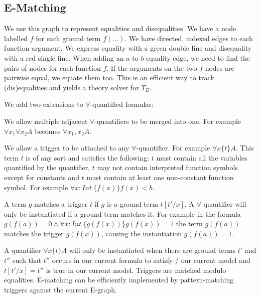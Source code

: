 \subsection{E-Matching}
\begin{mytitle}[E-graph] We use this graph to represent equalities and disequalities. We have a node labelled $f$ for each ground term $f(\ldots)$. We have directed, indexed edges to each function argument. We express equality with a green double line and disequality with a red single line. When adding an $a$ to $b$ equality edge, we need to find the pairs of nodes for each function $f$. If the arguments on the two $f$ nodes are pairwise equal, we equate them too. This is an efficient way to track (dis)equalities and yields a theory solver for $T_E$.
\end{mytitle}

\begin{mytitle} We add two extensions to $\forall$-quantified formulas:
    \begin{mysubtitle} We allow multiple adjacent $\forall$-quantifiers to be merged into one. For example $\forall x_1 \forall x_2 A$ becomes $\forall x_1, x_2 A$.
    \end{mysubtitle}
    \begin{mysubtitle}[Triggers] We allow a trigger to be attached to any $\forall$-quantifier. For example $\forall x \{t\} A$. This term $t$ is of any sort and satisfies the following: $t$ must contain all the variables quantified by the quantifier, $t$ may not contain interpreted function symbols except for constants and $t$ must contain at least one non-constant function symbol. For example $\forall x: Int\ \{f(x)\} f(x) < b$.
    \end{mysubtitle}
\end{mytitle}
\begin{mytitle} A term $g$ matches a trigger $t$ if $g$ is a ground term $t[t'/x]$. A $\forall$-quantifier will only be instantiated if a ground term matches it. For example in the formula $g(f(a))=0 \land \forall x: Int\ \{g(f(x))\} g(f(x)) = 1$ the term $g(f(a))$ matches the trigger $g(f(x))$, causing the instantiation $g(f(a))=1$.
\end{mytitle}
\begin{mytitle}[E-matching] A quantifier $\forall x\{t\} A$ will only be instantiated when there are ground terms $t'$ and $t''$ such that $t''$ occurs in our current formula to satisfy / our current model and $t[t'/x] = t''$ is true in our current model. Triggers are matched modulo equalities. E-matching can be efficiently implemented by pattern-matching triggers against the current E-graph.
\end{mytitle}
